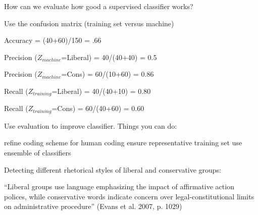 \documentclass[kp]{foilpack}
\begin{document}
How can we evaluate how good a supervised classifier works? 

Use the confusion matrix (training set versus machine)



\begin{center}
\end{center}

\vspace*{0.5cm}

Accuracy = (40+60)/150 = .66

Precision ($Z_{machine}$=Liberal) = 40/(40+40) = 0.5

Precision ($Z_{machine}$=Cons) = 60/(10+60) = 0.86

Recall ($Z_{training}$=Liberal) = 40/(40+10) = 0.80

Recall ($Z_{training}$=Cons) = 60/(40+60) = 0.60



Use evaluation to improve classifier. Things you can do:

\ita
\itm refine coding scheme for human coding
\itm ensure representative training set
\itm use ensemble of classifiers

\itz


Detecting different rhetorical styles of liberal and conservative groups:

``Liberal groups use language emphasizing the impact of affirmative action polices, while conservative words indicate concern over legal-constitutional limits on administrative procedure'' (Evans et al. 2007, p. 1029)

\newpage
\end{document}
